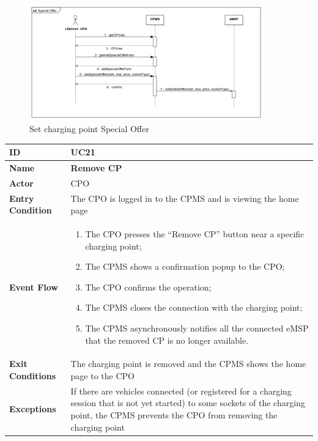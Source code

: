 \documentclass{Configuration_Files/PoliMi3i_thesis}
\begin{document}
\begin{figure}[H]
    \centering
    \includegraphics[width=0.9\textwidth]{Images/UseCases/SetChargingPointSpecialOffer.jpg}
    \caption{Set charging point Special Offer}
\end{figure}


\newpage\begin{table}[H]
    \begin{xltabular}{\textwidth}{| >{}l | X |}
    \hline
    \textbf{ID} & \textbf{UC21}\T\B\\
    \hline
    \textbf{Name} & \textbf{Remove CP}\T\B\\
    \hline \hline
    \textbf{Actor} & CPO\T\B \\
    \hline
    \textbf{Entry Condition} & The CPO is logged in to the CPMS and is viewing the home page\T\B\\
    \hline
    \textbf{Event Flow} & 
        \begin{enumerate}
        \item The CPO presses the “Remove CP” button near a specific charging point;
        \item The CPMS shows a confirmation popup to the CPO;
        \item The CPO confirms the operation;
        \item The CPMS closes the connection with the charging point;
        \item The CPMS asynchronously notifies all the connected eMSP that the removed CP is no longer available.
        \end{enumerate}\B\\
    \hline
    \textbf{Exit Conditions} & The charging point is removed and the CPMS shows the home page to the CPO\B\\
    \hline
    \textbf{Exceptions} & If there are vehicles connected (or registered for a charging session that is not yet started) to some sockets of the charging point, the CPMS prevents the CPO from removing the charging point\B\\
    \hline
    \end{xltabular}
\end{table}
\end{document}
